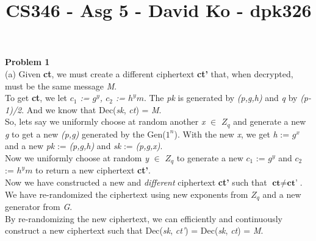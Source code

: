 \documentclass[10pt]{article}
\title{CS346 - Asg 5 - David Ko - dpk326}
\begin{document}
\maketitle
\date{}


\noindent \large \textbf{Problem 1}\\
(a) Given \textbf{ct}, we must create a different ciphertext \textbf{ct'} that, when decrypted, must be the same message \emph{M}.\\
\indent To get \textbf{ct}, we let \emph{$c_{1}$ := $g^{y}$, $c_{2}$ := $h^{y}m$}. The \emph{pk} is generated by \emph{(p,g,h)} and \emph{q} by \emph{(p-1)/2}. And we know that Dec(\emph{sk}, \emph{ct}) = \emph{M}.\\

\indent So, lets say we uniformly choose at random another \emph{x} $\in$ \textbf{$Z_{q}$} and generate a new \emph{g} to get a new \emph{(p,g)} generated by the Gen($1^{n}$). With the new \emph{x}, we get \emph{h} := \emph{$g^{x}$} and a new \emph{pk} := \emph{(p,g,h)} and \emph{sk} := \emph{(p,g,x)}.\\
\indent Now we uniformly choose at random \emph{y} $\in$ \textbf{$Z_{q}$} to generate a new \emph{$c_{1}$} := \emph{$g^{y}$} and \emph{$c_{2}$} := \emph{$h^{y}m$} to return a new ciphertext \textbf{ct'}.\\
\indent Now we have constructed a new and \emph{different} ciphertext \textbf{ct'} such that $\textbf{ct} \neq \textbf{ct'}$.\\
\indent We have re-randomized the ciphertext using new exponents from \textbf{$Z_{q}$} and a new generator from \emph{G}.\\
\indent By re-randomizing the new ciphertext, we can efficiently and continuously construct a new ciphertext such that Dec(\emph{sk}, \emph{ct'}) = Dec(\emph{sk}, \emph{ct}) = \emph{M}.\\
\end{document}
